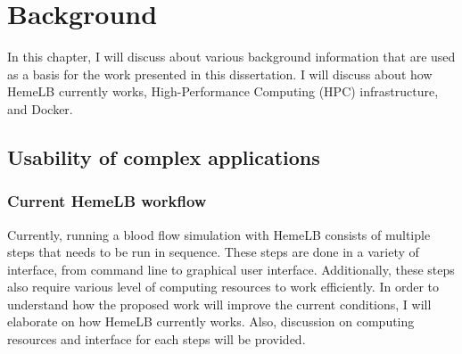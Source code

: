  

\chapter[Background]{Background}

In this chapter, I will discuss about various background information that are used as a basis for the work presented in this dissertation. I will discuss about how HemeLB currently works, High-Performance Computing (HPC) infrastructure, and Docker.


\section{Usability of complex applications}

\subsection{Current HemeLB workflow}

Currently, running a blood flow simulation with HemeLB consists of multiple steps that needs to be run in sequence. These steps are done in a variety of interface, from command line to graphical user interface. Additionally, these steps also require various level of computing resources to work efficiently. In order to understand how the proposed work will improve the current conditions, I will elaborate on how HemeLB currently works. Also, discussion on computing resources and interface for each steps will be provided.




\vspace{1cm}

\noindent%
\begin{minipage}{\linewidth}%
\label{fig:hemelb-workflow}%
\end{minipage}

